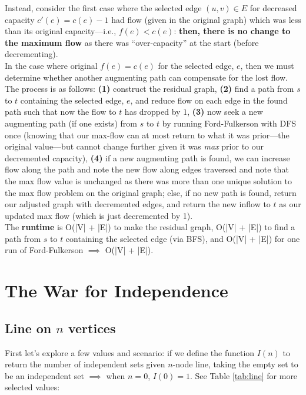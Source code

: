 \documentclass[conference]{styles/acmsiggraph}
\newcommand{\?}{\stackrel{?}{=}}
\DeclareRobustCommand{\mybox}[2][gray!20]{%
\begin{tcolorbox}[   %
        breakable,
        left=0pt,
        right=0pt,
        top=0pt,
        bottom=0pt,
        colback=#1,
        colframe=#1,
        width=\dimexpr\textwidth\relax, 
        enlarge left by=0mm,
        boxsep=5pt,
        arc=0pt,outer arc=0pt,
        ]
        #2
\end{tcolorbox}
}
\begin{document}
\mybox{
Instead, consider the first case where the selected edge $(u,v) \in E$ for decreased capacity $c'(e) = c(e) - 1$ had flow (given in the original graph) which was less than its original capacity---i.e., $f(e) < c(e)$:  \textbf{then, there is no change to the maximum flow} as there was \enquote{over-capacity} at the start (before decrementing).\\

In the case where original $f(e) = c(e)$ for the selected edge, $e$, then we must determine whether another augmenting path can compensate for the lost flow.  The process is as follows: \textbf{(1)} construct the residual graph, \textbf{(2)} find a path from $s$ to $t$ containing the selected edge, $e$, and reduce flow on each edge in the found path such that now the flow to $t$ has dropped by $1$, \textbf{(3)} now seek a new augmenting path (if one exists) from $s$ to $t$ by running Ford-Fulkerson with DFS once (knowing that our max-flow can at most return to what it was prior---the original value---but cannot change further given it was \textit{max} prior to our decremented capacity), \textbf{(4)} if a new augmenting path is found, we can increase flow along the path and note the new flow along edges traversed and note that the max flow value is unchanged as there was more than one unique solution to the max flow problem on the original graph; else, if no new path is found, return our adjusted graph with decremented edges, and return the new inflow to $t$ as our updated max flow (which is just decremented by 1).\\

The \textbf{runtime} is O(|V| + |E|) to make the residual graph, O(|V| + |E|) to find a path from $s$ to $t$ containing the selected edge (via BFS), and O(|V| + |E|) for one run of Ford-Fulkerson $\implies$ O(|V| + |E|).}

\newpage


\section{The War for Independence}
\subsection{Line on $n$ vertices}
First let's explore a few values and scenario: if we define the function $I(n)$ to return the number of independent sets given $n$-node line, taking the empty set to be an independent set $\implies$ when $n=0$, $I(0) = 1$.  See Table \ref{tab:line} for more selected values:
\end{document}
